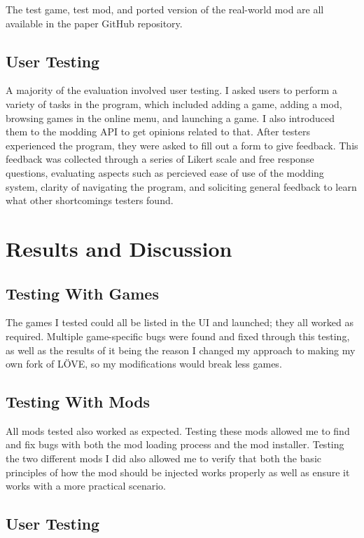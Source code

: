 \documentclass[10pt,twocolumn]{article}
\begin{document}
The test game, test mod, and ported version of the real-world mod are all
available in the paper GitHub repository.

\subsection{User Testing}

A majority of the evaluation involved user testing. I asked users to perform
a variety of tasks in the program, which included adding a game, adding a
mod, browsing games in the online menu, and launching a game. I also
introduced them to the modding API to get opinions related to that.
After testers experienced the program, they were asked to fill out a form
to give feedback. This feedback was collected through a series of
Likert scale and free response questions, evaluating aspects such as
percieved ease of use of the modding system, clarity of navigating the
program, and soliciting general feedback to learn what other shortcomings
testers found.

\section{Results and Discussion}

\subsection{Testing With Games}

The games I tested could all be listed in the UI
and launched; they all worked as required.
Multiple game-specific bugs were found and fixed through this
testing, as well as the results of it being the reason I changed my approach
to making my own fork of LÖVE, so my modifications would break less games.

\subsection{Testing With Mods}

All mods tested also worked as expected. Testing these mods allowed me to
find and fix bugs with both the mod loading process and the mod installer.
Testing the two different mods I did also allowed me to verify that both
the basic principles of how the mod should be injected works properly
as well as ensure it works with a more practical scenario.

\subsection{User Testing}
\end{document}
